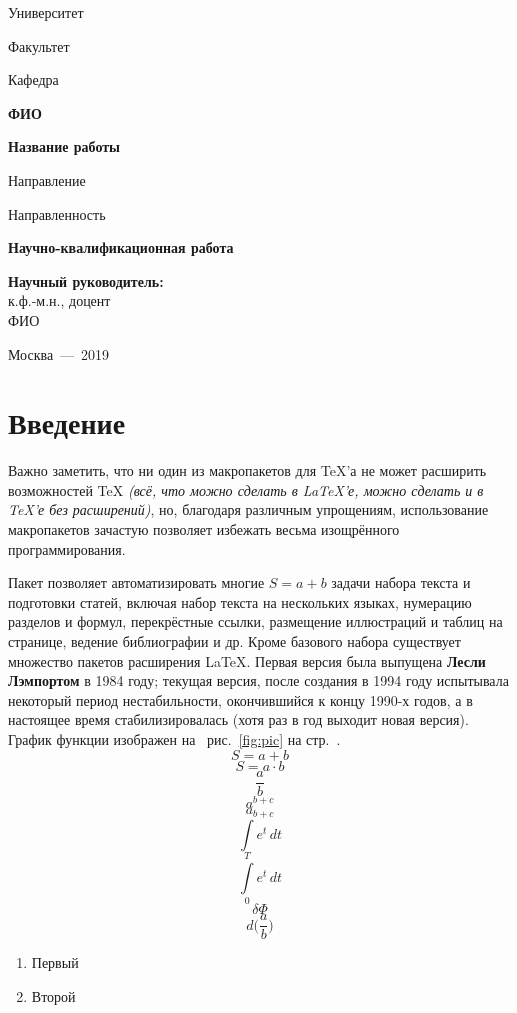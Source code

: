 \documentclass[14pt,a4paper,oneside]{article}
\begin{document}
\begin{titlepage}
\centerline{Университет}\par
\centerline{Факультет}\par
\centerline{Кафедра}
\vfill
\centerline{\bf ФИО}\par
\bigskip
\centerline{\bf Название работы}\par
\bigskip
\centerline{Направление}\par
\centerline{Направленность}
\vfill
\centerline{\bf Научно-квалификационная работа}
\vfill
\begin{flushright}
{\bf Научный руководитель:}\\
к.ф.-м.н., доцент \\ ФИО
\end{flushright}
\vfill
\centerline{Москва~---~2019}
\end{titlepage}

\tableofcontents
\newpage
\section{Введение}
Важно заметить, что ни один из макропакетов для TeX’а не может расширить возможностей TeX {\it (всё, что можно сделать в LaTeX’е, можно сделать и в TeX’е без расширений)}, но, благодаря различным упрощениям, использование макропакетов зачастую позволяет избежать весьма изощрённого программирования.

Пакет позволяет автоматизировать многие \(S = a+b \) задачи набора текста и подготовки статей, включая набор текста на нескольких языках, нумерацию разделов и формул, перекрёстные ссылки, размещение иллюстраций и таблиц на странице, ведение библиографии и др. Кроме базового набора существует множество пакетов расширения LaTeX. Первая версия была выпущена {\bf Лесли Лэмпортом} в 1984 году; текущая версия, после создания в 1994 году испытывала некоторый период нестабильности, окончившийся к концу 1990-х годов, а в настоящее время стабилизировалась (хотя раз в год выходит новая версия).
График функции изображен на ~рис.\, \ref{fig:pic} на стр.\, \pageref{fig:pic}.
$$ S = a + b $$
$$ S = a \cdot b $$
$$ \frac{a}{b} $$
$$ a^{b+c}$$
$$ a_{b+c}$$
$$ \int e^{t} \, dt$$
$$ \int \limits_0^T e^{t} \, dt$$
$$ \delta \Phi $$ 
$$ d\Bigg(\frac{a}{b}\Bigg)$$
\begin{enumerate}
    \item Первый
    \item Второй
\end{enumerate}
\end{document}
